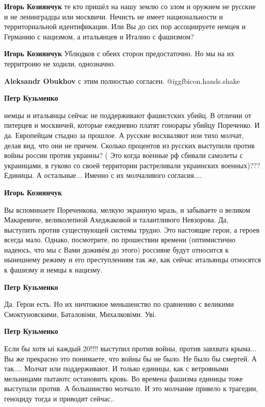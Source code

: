 \begin{itemize}
\begin{itemize}
\begin{itemize}
\textbf{Игорь Козиянчук} те кто пришёл на нашу землю со злом и оружием не русские и не ленинградцы или москвичи. Нечисть не имеет национальности и территориальной идентификации. Или Вы до сих пор ассоциируете немцев и Германию с нацизмом, а итальянцев и Италию с фашизмом?

\textbf{Игорь Козиянчук}
Ублюдков с обеих сторон предостаточно.
Но мы на их территроию не ходили, однозначно.

\textbf{Aleksandr Obukhov} с этим полностью согласен. @igg{fbicon.hands.shake} 

\textbf{Петр Кузьменко} 

немцы и итальянцы сейчас не поддерживают фашистских убийц. В отличии от
питерцев и москвичей, которые ежедневно платят гонорары убийцу Пореченко. И да.
Европейцам стыдно за прошлое. А русские восхваляют иои тихо молчат, делая вид,
что они не причем. Сколько процентов из русских выступили против войны россии
против украины? ( Это когда военные рф сбивали самолеты с украинцами, в гуково
со своей территории растреливали украинских военных)??? Единицы. А остальные...
Именно с их молчаливого согласия....

\textbf{Игорь Козиянчук} 

Вы вспоминаете Пореченкова, мелкую экранную мразь, и забываете о великом
Макаревиче, великолепной Ахеджаковой и талантливого Невзорова. Да, выступить
против существующей системы трудно. Это настоящие герои, а героев всегда мало.
Однако, посмотрите, по прошествии времени (оптимистично надеюсь, что мы с Вами
доживём до этого) россияне будут относится к нынешнему режиму и его
преступлениям так же, как сейчас итальянцы относятся к фашизму и немцы к
нацизму.

\textbf{Петр Кузьменко} 

Да. Герои есть. Но их ничтожное меньшенство по сравнению с великими
Смоктуновскими, Баталовіми, Михалковіми. Уві.

\textbf{Петр Кузьменко} 

Если бы хотя ыі каждый 20!!!! выступил против войны, против завхвата крыма...
Вы же прекрасно это понимаете, что войны бы не было. Не было бы смертей. А
так.... Молчат или поддерживают. И только единицы, как с ветрояными мельницами
пытаютс остановить кровь. Во времена фашизма единицы тоже выступали против. А
большинство молчало. И это молчание привело к трагедии, геноциду тогда и
приводит сейчас..


\end{itemize}
\end{itemize}
\end{itemize}
